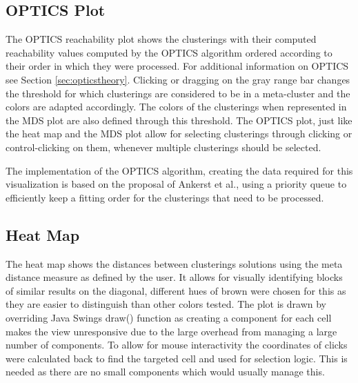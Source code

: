 \documentclass[
	a4paper,
	english,
	twoside,
	openright,               
	11pt                            
	]{report}
\begin{document}
\subsection{OPTICS Plot}
The OPTICS reachability plot shows the clusterings with their computed reachability values computed by the OPTICS algorithm ordered according to their order in which they were processed. For additional information on OPTICS see Section \ref{sec:opticstheory}. Clicking or dragging on the gray range bar changes the threshold for which clusterings are considered to be in a meta-cluster and the colors are adapted accordingly. The colors of the clusterings when represented in the MDS plot are also defined through this threshold. The OPTICS plot, just like the heat map and the MDS plot allow for selecting clusterings through clicking or control-clicking on them, whenever multiple clusterings should be selected.

The implementation of the OPTICS algorithm, creating the data required for this visualization is based on the proposal of Ankerst et al., using a priority queue to efficiently keep a fitting order for the clusterings that need to be processed.

\subsection{Heat Map}
The heat map shows the distances between clusterings solutions using the meta distance measure as defined by the user. It allows for visually identifying blocks of similar results on the diagonal, different hues of brown were chosen for this as they are easier to distinguish than other colors tested. The plot is drawn by overriding Java Swings \cite{javaswing} draw() function as creating a component for each cell makes the view unresponsive due to the large overhead from managing a large number of components. To allow for mouse interactivity the coordinates of clicks were calculated back to find the targeted cell and used for selection logic. This is needed as there are no small components which would usually manage this.
\end{document}
